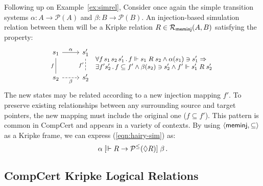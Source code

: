 \documentclass[sigplan,screen]{acmart}
\newcommand{\figsize}{\small}
\begin{document}
\begin{example} \label{ex:sim} %
Following up on Example~\ref{ex:simrel},
Consider once again the simple transition systems
$\alpha : A \rightarrow \mathcal{P}(A)$ and
$\beta : B \rightarrow \mathcal{P}(B)$.
An injection-based simulation relation between them
will be a Kripke relation
$R \in \mathcal{R}_{ \mathsf{meminj} }(A, B)$
satisfying the property:
\begin{equation} \label{eqn:hairy-sim}
  \begin{tikzcd}
    s_1 \arrow[r, "\alpha"]
        \arrow[d, dash, "f"'] &
    s_1' \arrow[d, dashed, dash, "f'"'] \\ %
    s_2 \arrow[r, dashed, "\beta"'] &
    s_2'
  \end{tikzcd}
 {\figsize
  \begin{array}{l}
    \forall f \, s_1 \, s_2 \, s_1' \,.\,
      f \Vdash s_1 \mathrel{R} s_2 \wedge
      \alpha(s_1) \ni s_1' \Rightarrow \\
    \exists f' s_2' \,.\,
      f \subseteq f' \wedge
      \beta(s_2) \ni s_2' \wedge
      f' \Vdash s_1' \mathrel{R} s_2'
  \end{array}}
\end{equation}
The new states may be related according to
a new injection mapping $f'$.
To preserve existing relationships
between any surrounding source and target pointers,
the new mapping must include
the original one ($f \subseteq f'$).
This pattern is common in CompCert
and appears in a variety of contexts.
By using $\langle  \mathsf{meminj} , {\subseteq} \rangle$
as a Kripke frame,
we can express
(\ref{eqn:hairy-sim}) as:
\[
  \alpha \mathrel{[{\Vdash R \rightarrow \mathcal{P}^\le(\Diamond R)}]} \beta \,.
\]
\end{example}


\subsection{CompCert Kripke Logical Relations} \label{sec:cklrdef} %
\end{document}
